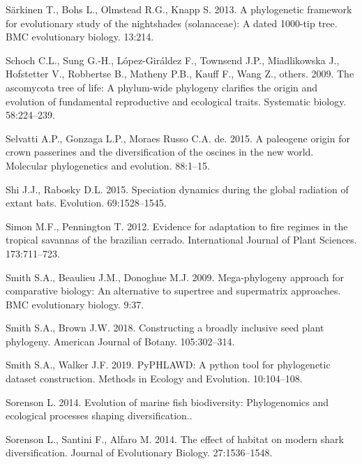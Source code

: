 \documentclass[]{article}
\begin{document}
\leavevmode\hypertarget{ref-sarkinen2013solanaceae}{}%
Särkinen T., Bohs L., Olmstead R.G., Knapp S. 2013. A phylogenetic framework for evolutionary study of the nightshades (solanaceae): A dated 1000-tip tree. BMC evolutionary biology. 13:214.

\leavevmode\hypertarget{ref-schoch2009ascomycota}{}%
Schoch C.L., Sung G.-H., López-Giráldez F., Townsend J.P., Miadlikowska J., Hofstetter V., Robbertse B., Matheny P.B., Kauff F., Wang Z., others. 2009. The ascomycota tree of life: A phylum-wide phylogeny clarifies the origin and evolution of fundamental reproductive and ecological traits. Systematic biology. 58:224--239.

\leavevmode\hypertarget{ref-selvatti2015paleogene}{}%
Selvatti A.P., Gonzaga L.P., Moraes Russo C.A. de. 2015. A paleogene origin for crown passerines and the diversification of the oscines in the new world. Molecular phylogenetics and evolution. 88:1--15.

\leavevmode\hypertarget{ref-shi2015speciation}{}%
Shi J.J., Rabosky D.L. 2015. Speciation dynamics during the global radiation of extant bats. Evolution. 69:1528--1545.

\leavevmode\hypertarget{ref-simon2012cerrado}{}%
Simon M.F., Pennington T. 2012. Evidence for adaptation to fire regimes in the tropical savannas of the brazilian cerrado. International Journal of Plant Sciences. 173:711--723.

\leavevmode\hypertarget{ref-smith2009mega}{}%
Smith S.A., Beaulieu J.M., Donoghue M.J. 2009. Mega-phylogeny approach for comparative biology: An alternative to supertree and supermatrix approaches. BMC evolutionary biology. 9:37.

\leavevmode\hypertarget{ref-smith2018constructing}{}%
Smith S.A., Brown J.W. 2018. Constructing a broadly inclusive seed plant phylogeny. American Journal of Botany. 105:302--314.

\leavevmode\hypertarget{ref-smith2019pyphlawd}{}%
Smith S.A., Walker J.F. 2019. PyPHLAWD: A python tool for phylogenetic dataset construction. Methods in Ecology and Evolution. 10:104--108.

\leavevmode\hypertarget{ref-sorenson2014evolution}{}%
Sorenson L. 2014. Evolution of marine fish biodiversity: Phylogenomics and ecological processes shaping diversification..

\leavevmode\hypertarget{ref-sorenson2014effect}{}%
Sorenson L., Santini F., Alfaro M. 2014. The effect of habitat on modern shark diversification. Journal of Evolutionary Biology. 27:1536--1548.
\end{document}
